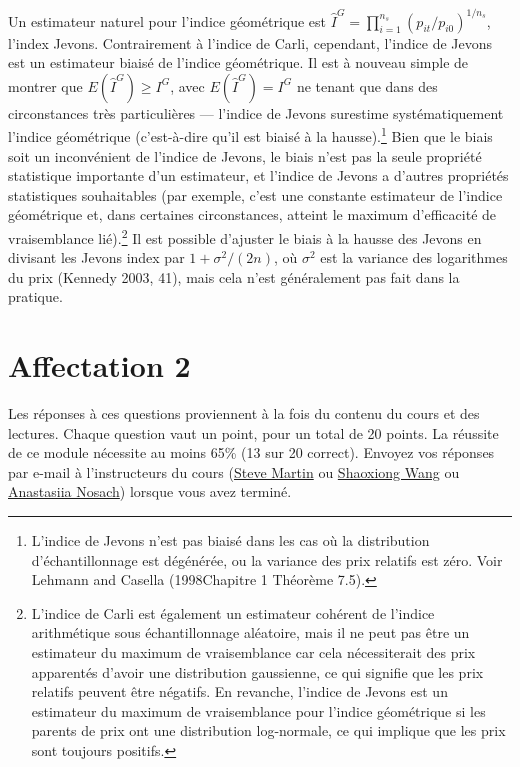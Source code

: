\documentclass[
]{article}
\begin{document}
Un estimateur naturel pour l'indice géométrique est \(\hat{I}^{G} = \prod_{i = 1}^{n_{s}} (p_{it} / p_{i0})^{1 / n_{s}}\), l'index Jevons. Contrairement à l'indice de Carli, cependant, l'indice de Jevons est un estimateur biaisé de l'indice géométrique. Il est à nouveau simple de montrer que \(E(\hat{I}^{G}) \geq I^{G}\), avec \(E(\hat{I}^{G}) = I^{G}\) ne tenant que dans des circonstances très particulières --- l'indice de Jevons surestime systématiquement l'indice géométrique (c'est-à-dire qu'il est biaisé à la hausse).\footnote{L'indice de Jevons n'est pas biaisé dans les cas où la distribution d'échantillonnage est dégénérée, ou la variance des prix relatifs est zéro. Voir Lehmann and Casella (1998Chapitre 1 Théorème 7.5).} Bien que le biais soit un inconvénient de l'indice de Jevons, le biais n'est pas la seule propriété statistique importante d'un estimateur, et l'indice de Jevons a d'autres propriétés statistiques souhaitables (par exemple, c'est une constante estimateur de l'indice géométrique et, dans certaines circonstances, atteint le maximum d'efficacité de vraisemblance lié).\footnote{L'indice de Carli est également un estimateur cohérent de l'indice arithmétique sous échantillonnage aléatoire, mais il ne peut pas être un estimateur du maximum de vraisemblance car cela nécessiterait des prix apparentés d'avoir une distribution gaussienne, ce qui signifie que les prix relatifs peuvent être négatifs. En revanche, l'indice de Jevons est un estimateur du maximum de vraisemblance pour l'indice géométrique si les parents de prix ont une distribution log-normale, ce qui implique que les prix sont toujours positifs.} Il est possible d'ajuster le biais à la hausse des Jevons en divisant les Jevons index par \(1 + \sigma^{2} / (2n)\), où \(\sigma^{2}\) est la variance des logarithmes du prix (Kennedy 2003, 41), mais cela n'est généralement pas fait dans la pratique.

\hypertarget{affectation-2}{%
\section{Affectation 2}\label{affectation-2}}

Les réponses à ces questions proviennent à la fois du contenu du cours et des lectures. Chaque question vaut un point, pour un total de 20 points. La réussite de ce module nécessite au moins 65\% (13 sur 20 correct). Envoyez vos réponses par e-mail à l'instructeurs du cours (\href{mailto:steve.martin5@canada.ca}{Steve Martin} ou \href{mailto:shaoxiong.wang@canada.ca}{Shaoxiong Wang} ou \href{mailto:anastasiia.nosach@canada.ca}{Anastasiia Nosach}) lorsque vous avez terminé.
\end{document}
